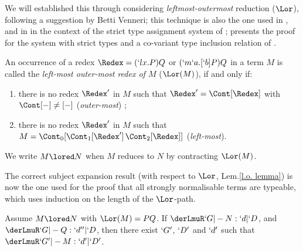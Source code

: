 \documentclass{lmcs}
\begin{document}
We will established this through considering \emph{leftmost-outermost} reduction ($\Lor$), following a suggestion by Betti Venneri; this technique is also the one used in \cite{Krivine-book'93}, and in \cite{Bakel-NDJFL'04} in the context of the strict type assignment system of \cite{Bakel-TCS'92}; \cite{Bakel-ACM'11} presents the proof for the system with strict types and a co-variant type inclusion relation of \cite{Bakel-TCS'95}.

 \begin {defi} %
An occurrence of a redex $\Redex = ( `l x.P)Q$ or $(`m`a.[`b]P)Q$ in a term $M$ is called the \emph{left-most outer-most redex of $M$} ($\Lor(M)$), if and only if:

 \begin {enumerate}
 \item there is no redex $\Redex'$ in $M$ such that $\Redex' = \Cont[ \Redex ] $
with $\Cont[ - ]\not= [-]$ (\emph{outer-most}) ;
 \item there is no redex $\Redex'$ in $M$ such that $M = \Cont_{0}[{ \Cont_{1}[\Redex'] \, \Cont_{2}[ \Redex ]}] $ (\emph{left-most}).
 \end {enumerate}
We write $M \lored N$ when $M$ reduces to $N$ by contracting $\Lor(M)$.
 \end {defi}

The correct subject expansion result (with respect to $\Lor$, Lem.\skp\ref{l.o. lemma}) is now the one used for the proof that all strongly normalisable terms are typeable, which uses induction on the length of the $\Lor$-path.


 \begin {lem} \label {l.o. lemma}
Assume $M \lored N$ with $\Lor(M) = PQ$. 
If $\derLmuR `G |- N : `d | `D $, and 
 $\derLmuR `G |- Q : `d'' | `D $,
then there exist $`G'$, $`D'$ and $`d'$ such that $\derLmuR `G' |- M : `d' | `D' $.
 \end{lem}
\end{document}
